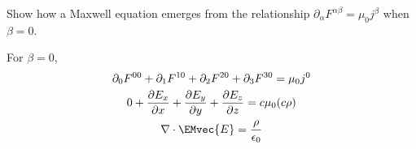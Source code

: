 \documentclass[12pt]{article}
\begin{document}
\maketitle

\begin{question}
	Show how a Maxwell equation emerges from the relationship \(\partial_{\alpha} F^{\alpha \beta} = \mu_{0} j^{\beta}\) when \(\beta = 0\).
		\begin{answer}
			For \(\beta = 0\),
			\begin{gather*}
				 \partial_{0}F^{00} + \partial_{1}F^{10} + \partial_{2}F^{20} + \partial_{3}F^{30} = \mu_{0}j^{0}\\
				 0 + \frac{\partial E_{x}}{\partial x} + \frac{\partial E_{y}}{\partial y} + \frac{\partial E_{z}}{\partial z} = c \mu_{0}(c \rho)\\
				 \nabla\cdot \EMvec{E} = \frac{\rho}{\epsilon_{0}}
			\end{gather*}
		\end{answer}
\end{question}
\end{document}
